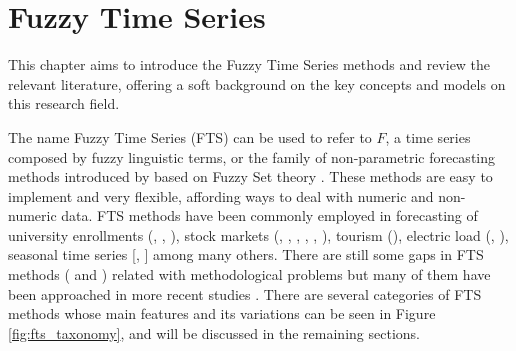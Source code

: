 \chapter[Fuzzy Time Series]{Fuzzy Time Series} 
\label{chap:review_fts}


This chapter aims to introduce the Fuzzy Time Series methods and review the relevant literature, offering a soft background on  the key concepts and models on this research field.

The name Fuzzy Time Series (FTS) can be used to refer to $F$, a time series composed by fuzzy linguistic terms, or the family of non-parametric forecasting methods introduced by \cite{song1993fuzzy} based on Fuzzy Set theory \cite{Zadeh1965}. These methods are easy to implement and very flexible, affording ways to  deal with numeric and non-numeric data.  FTS methods have been commonly employed in forecasting of university enrollments (\cite{song1993fuzzy}, \cite{Song1994}, \cite{ismail2011enrollment}), 
stock markets (\cite{Sadaei2016}, \cite{Lee2013},  \cite{chen2014high}, \cite{Sun2015}, \cite{Talarposhti2016a}, \cite{efendi2013improved}), 
tourism (\cite{Lee2011}), 
electric load (\cite{Ismail2015}, \cite{Sadaei2017}),  
seasonal time series [\cite{Song1999},  \cite{Chang1997}] among many others.
There are still some gaps in FTS methods (\cite{Sadaei2013} and \cite{Georgescu2010}) related with methodological problems but many of them have been approached in more recent studies \cite{JavedaniSadaei2016c}. There are several categories of FTS methods whose main features and its variations can be seen in Figure \ref{fig:fts_taxonomy}, and will be discussed in the remaining sections.  

